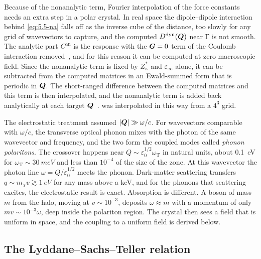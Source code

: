 Because of the nonanalytic term, Fourier interpolation of the force constants needs an extra step in a polar crystal. In real space the dipole--dipole interaction behind \cref{eq:5.5-na} falls off as the inverse cube of the distance, too slowly for any grid of wavevectors to capture, and the computed $D^{\mathrm{dyn}}(\bm{Q})$ near $\mathrm{\Gamma}$ is not smooth. The analytic part $C^{\mathrm{an}}$ is the response with the $\bm{G} = 0$ term of the Coulomb interaction removed~\cite{pick1970microscopic}, and for this reason it can be computed at zero macroscopic field. Since the nonanalytic term is fixed by $Z^*_\kappa$ and $\varepsilon_\infty$ alone, it can be subtracted from the computed matrices in an Ewald-summed form that is periodic in $\bm{Q}$. The short-ranged difference between the computed matrices and this term is then interpolated, and the nonanalytic term is added back analytically at each target $\bm{Q}$~\cite{gonze1997dynamical}.  was interpolated in this way from a $4^3$ grid.

The electrostatic treatment assumed $|\bm{Q}| \gg \omega/c$. For wavevectors comparable with $\omega/c$, the transverse optical phonon mixes with the photon of the same wavevector and frequency, and the two form the coupled modes called \emph{phonon polaritons}. The crossover happens near $Q \sim \varepsilon_0^{1/2}\omega_{\mathrm{T}}$ in natural units, about \SI{0.1}{eV} for $\omega_{\mathrm{T}} \sim \SI{30}{meV}$ and less than $10^{-4}$ of the size of the zone. At this wavevector the photon line $\omega = Q/\varepsilon_0^{1/2}$ meets the phonon. Dark-matter scattering transfers $q \sim m_\chi v \gtrsim \SI{1}{eV}$ for any mass above a keV, and for the phonons that scattering excites, the electrostatic result is exact. Absorption is different. A boson of mass $m$ from the halo, moving at $v \sim 10^{-3}$, deposits $\omega \approx m$ with a momentum of only $mv \sim 10^{-3}\omega$, deep inside the polariton region. The crystal then sees a field that is uniform in space, and the coupling to a uniform field is derived below.

\subsection{The Lyddane--Sachs--Teller relation}

